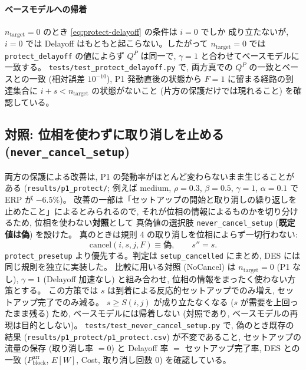 \documentclass[a4paper,11pt]{article}
\newcommand{\code}[1]{\texttt{#1}}
\newcommand{\blk}{\mathrm{block}}
\begin{document}
\paragraph{ベースモデルへの帰着}
$n_{\mathrm{target}}=0$ のとき \eqref{eq:protect-delayoff} の条件は $i=0$ でしか
成り立たないが, $i=0$ では Delayoff はもともと起こらない。したがって
$n_{\mathrm{target}}=0$ では \code{protect\_delayoff} の値によらず $Q^P$ は同一で,
$\gamma=1$ と合わせてベースモデルに一致する。
\code{tests/test\_protect\_delayoff.py} で, 両方真での $Q^P$ の一致とベースとの一致
(相対誤差 $10^{-10}$), P1 発動直後の状態から $F=1$ に留まる経路の到達集合に
$i+s<n_{\mathrm{target}}$ の状態がないこと (片方の保護だけでは現れること) を確認している。

\subsection{対照: 位相を使わずに取り消しを止める (\code{never\_cancel\_setup})}
\label{sec:never-cancel}

両方の保護による改善は, P1 の発動率がほとんど変わらないまま生じることがある
(\code{results/p1\_protect/}; 例えば medium, $\rho=0.3$, $\beta=0.5$, $\gamma=1$,
$\alpha=0.1$ で ERP が $-6.5\%$)。
改善の一部は「セットアップの開始と取り消しの繰り返しを止めたこと」によるとみられるので,
それが位相の情報によるものかを切り分けるため, 位相を使わない\textbf{対照}として
真偽値の選択肢 \code{never\_cancel\_setup} (\textbf{既定値は偽}) を設けた。
真のときは規則 4 の取り消しを位相によらず一切行わない:
\begin{equation}
  \mathrm{cancel}(i,s,j,F)\equiv\text{偽},\qquad s''=s .
  \label{eq:never-cancel}
\end{equation}
\code{protect\_presetup} より優先する。判定は \code{setup\_cancelled} にまとめ,
DES には同じ規則を独立に実装した。
比較に用いる対照 (NoCancel) は $n_{\mathrm{target}}=0$ (P1 なし), $\gamma=1$
(Delayoff 加速なし) と組み合わせ, 位相の情報をまったく使わない方策とする。
この方策では $s$ は到着による反応的セットアップでのみ増え, セットアップ完了でのみ減る。
$s\ge S(i,j)$ が成り立たなくなる ($s$ が需要を上回ったまま残る) ため,
ベースモデルには帰着しない (対照であり, ベースモデルの再現は目的としない)。
\code{tests/test\_never\_cancel\_setup.py} で, 偽のとき既存の結果
(\code{results/p1\_protect/p1\_protect.csv}) が不変であること,
セットアップの流量の保存 (取り消し率 $=0$) と Delayoff 率 $=$ セットアップ完了率,
DES との一致 ($P_\blk^{\mathrm{arr}}$, $E[W]$, Cost, 取り消し回数 $0$) を確認している。

\end{document}
